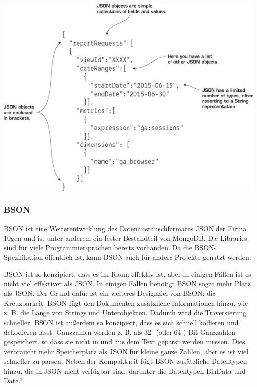 \begin{center}
\includegraphics[scale=1]{images/Darstellung_eines_JSON-Objekts}
\end{center}


\subsubsection{BSON}

BSON ist eine Weiterentwicklung des Datenaustauschformates JSON der Firma 10gen und ist unter anderem ein fester Bestandteil von MongoDB. Die Libraries sind für viele Programmiersprachen bereits vorhanden. Da die BSON-Spezifikation öffentlich ist, kann BSON auch für andere Projekte genutzt werden.\cite{thKloeln}

BSON ist so konzipiert, dass es im Raum effektiv ist, aber in einigen Fällen ist es nicht viel effektiver als JSON. In einigen Fällen benötigt BSON sogar mehr Platz als JSON. Der Grund dafür ist ein weiteres Designziel von BSON: die Kreuzbarkeit. BSON fügt den Dokumenten zusätzliche Informationen hinzu, wie z. B. die Länge von Strings und Unterobjekten. Dadurch wird die Traversierung schneller.\cite{bson} BSON ist außerdem so konzipiert, dass es sich schnell kodieren und dekodieren lässt. Ganzzahlen werden z. B. als 32- (oder 64-) Bit-Ganzzahlen gespeichert, so dass sie nicht in und aus dem Text geparst werden müssen. Dies verbraucht mehr Speicherplatz als JSON für kleine ganze Zahlen, aber es ist viel schneller zu parsen. Neben der Kompaktheit fügt BSON zusätzliche Datentypen hinzu, die in JSON nicht verfügbar sind, darunter die Datentypen BinData und Date.“